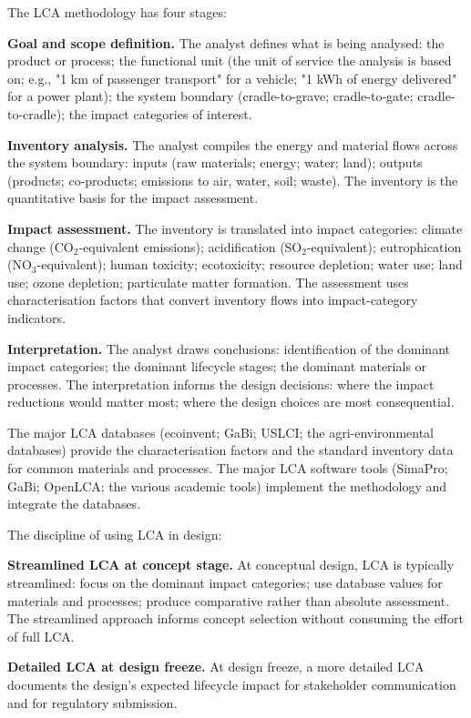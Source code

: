 The LCA methodology has four stages:

\textbf{Goal and scope definition.} The analyst defines what is being analysed: the product or process; the functional unit (the unit of service the analysis is based on; e.g., "1 km of passenger transport" for a vehicle; "1 kWh of energy delivered" for a power plant); the system boundary (cradle-to-grave; cradle-to-gate; cradle-to-cradle); the impact categories of interest.

\textbf{Inventory analysis.} The analyst compiles the energy and material flows across the system boundary: inputs (raw materials; energy; water; land); outputs (products; co-products; emissions to air, water, soil; waste). The inventory is the quantitative basis for the impact assessment.

\textbf{Impact assessment.} The inventory is translated into impact categories: climate change (CO$_2$-equivalent emissions); acidification (SO$_2$-equivalent); eutrophication (NO$_3$-equivalent); human toxicity; ecotoxicity; resource depletion; water use; land use; ozone depletion; particulate matter formation. The assessment uses characterisation factors that convert inventory flows into impact-category indicators.

\textbf{Interpretation.} The analyst draws conclusions: identification of the dominant impact categories; the dominant lifecycle stages; the dominant materials or processes. The interpretation informs the design decisions: where the impact reductions would matter most; where the design choices are most consequential.

The major LCA databases (ecoinvent; GaBi; USLCI; the agri-environmental databases) provide the characterisation factors and the standard inventory data for common materials and processes. The major LCA software tools (SimaPro; GaBi; OpenLCA; the various academic tools) implement the methodology and integrate the databases.

The discipline of using LCA in design:

\textbf{Streamlined LCA at concept stage.} At conceptual design, LCA is typically streamlined: focus on the dominant impact categories; use database values for materials and processes; produce comparative rather than absolute assessment. The streamlined approach informs concept selection without consuming the effort of full LCA.

\textbf{Detailed LCA at design freeze.} At design freeze, a more detailed LCA documents the design's expected lifecycle impact for stakeholder communication and for regulatory submission.

